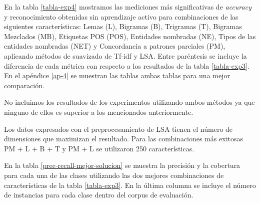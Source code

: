 En la tabla \ref{tabla-exp4} mostramos las mediciones más significativas de \textit{accuracy} y reconocimiento obtenidas sin aprendizaje activo para combinaciones de las siguientes características: Lemas (L), Bigramas (B), Trigramas (T), Bigramas Mezclados (MB), Etiquetas POS (POS), Entidades nombradas (NE), Tipos de las entidades nombradas (NET) y Concordancia a patrones parciales (PM), aplicando métodos de suavizado de Tf-idf y LSA. Entre paréntesis se incluye la diferencia de cada métrica con respecto a los resultados de la tabla \ref{tabla-exp3}. En el apéndice \ref{ap-4} se muestran las tablas ambas tablas para una mejor comparación.

No incluimos los resultados de los experimentos utilizando ambos métodos ya que ninguno de ellos es superior a los mencionados anteriormente.


Los datos expresados con el preprocesamiento de LSA tienen el número de dimensiones que maximizan el resultado. Para las combinaciones más exitosas PM + L + B + T y PM + L se utilizaron 250 características.

En la tabla \ref{prec-recall-mejor-solucion} se muestra la precisión y la cobertura para cada una de las clases utilizando las dos mejores combinaciones de características de la tabla \ref{tabla-exp3}. En la última columna se incluye el número de instancias para cada clase dentro del corpus de evaluación.

